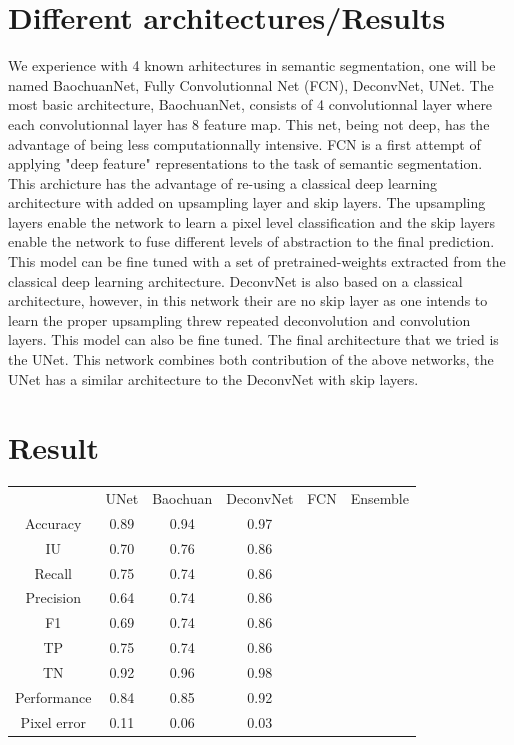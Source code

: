 \documentclass{article}
\begin{document}
\section{Different architectures/Results}
\label{sec:method}
We experience with 4 known arhitectures in semantic segmentation, one 
will be named BaochuanNet, Fully Convolutionnal Net (FCN), DeconvNet, 
UNet. The most basic architecture, BaochuanNet, consists of 4 
convolutionnal layer where each convolutionnal layer has 8 feature map. 
This net, being not deep, has the advantage of being less 
computationnally intensive. FCN is a first attempt of applying "deep 
feature" representations to the task of semantic segmentation. This 
archicture has the advantage of re-using a classical deep learning 
architecture with added on upsampling layer and skip layers. The 
upsampling layers enable the network to learn a pixel level classification 
and the skip layers enable the network to fuse different levels of 
abstraction to the final prediction. This model can be fine tuned with a 
set of pretrained-weights extracted from the classical deep learning 
architecture. DeconvNet is also based on a classical architecture, 
however, in this network their are no skip layer as one intends to learn 
the proper upsampling threw repeated deconvolution and convolution 
layers. This model can also be fine tuned. The final architecture that we tried is the UNet. This network combines both contribution of the above networks, the UNet has a similar architecture to the DeconvNet with skip layers.
\section{Result}
\label{sec:result}

\begin{tabular}{|c|c|c|c|c|c|}
 & UNet & Baochuan & DeconvNet & FCN & Ensemble \\
Accuracy          &       0.89 &       0.94 & 0.97\\
IU   &       0.70 &       0.76 &     0.86 \\
Recall                     &       0.75 &       0.74  &     0.86 &&\\
Precision                  &       0.64 &       0.74 &     0.86 &&\\
F1                         &       0.69 &       0.74 &     0.86 &&  \\
TP             &       0.75 &       0.74 &     0.86 && \\
TN             &       0.92 &       0.96 &     0.98 &&\\
Performance                &       0.84 &       0.85 &     0.92 &&\\
Pixel error                &       0.11 &       0.06 &     0.03 &&\\
\end{tabular}
\end{document}
